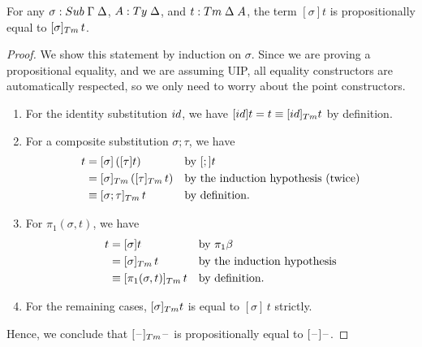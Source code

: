 \documentclass[a4paper,UKenglish,numberwithinsect,cleveref,thm-restate]{lipics-v2021}
\begin{document}
\begin{proposition}\label{prop:correctness-1}
  For any $\sigma : \Sub\;\Gamma\;\Delta$, $A : \Ty\;\Delta$, and $t : \Tm\;\Delta\;A$, the term $[\sigma]t$ is propositionally equal to $[\sigma]_{\Tm}\,t$.
\end{proposition}
\begin{proof}
  We show this statement by induction on $\sigma$. Since we are proving a propositional equality, and we are assuming UIP, all equality constructors are automatically respected, so we only need to worry about the point constructors.
  \begin{enumerate}
    \item For the identity substitution $\idS$, we have $[\idS]t = t \judgeq [\idS]_{\Tm} t$ by definition.
    \item For a composite substitution $\sigma; \tau$, we have
      \begin{align*}
        [\sigma;\tau]t & = [\sigma]\,([\tau] t)            && \text{by $[;]t$} \\
                       & = [\sigma]_{\Tm}\,([\tau]_{\Tm}\,t) && \text{by the induction hypothesis (twice)} \\ %
                       & \judgeq [\sigma;\tau]_{\Tm}\,t && \text{by definition.}
      \end{align*}
    \item For $\pi_1(\sigma, t)$, we have
      \begin{align*}
        [\pi_1(\sigma, t)]t & = [\sigma] t               && \text{by $\pi_1\beta$} \\
                            & = [\sigma]_{\Tm} \,t       && \text{by the induction hypothesis} \\ %
                            & \judgeq [\pi_1(\sigma, t)]_{\Tm}\,t && \text{by definition.}
      \end{align*}
    \item For the remaining cases, $[\sigma]_{\Tm} t$ is equal to $[\sigma]\,t$ strictly.
  \end{enumerate}
  Hence, we conclude that $[\blank]_{\Tm}\blank$ is propositionally equal to $[\mathord{\hspace{1pt}\text{--}\hspace{1pt}}]\mathord{\hspace{1pt}\text{--}\hspace{1pt}}$.
\end{proof}
\end{document}
